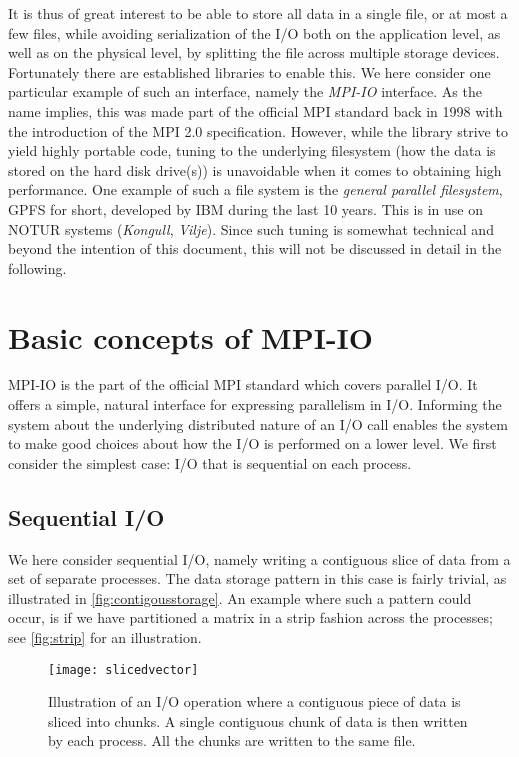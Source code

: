 It is thus of great interest to be able to store all data in a single file, or
at most a few files, while avoiding serialization of the I/O both on the
application level, as well as on the physical level, by splitting the file
across multiple storage devices. Fortunately there are established libraries to
enable this. We here consider one particular example of such an interface,
namely the \emph{MPI-IO} interface. As the name implies, this was made part of
the official MPI standard back in 1998 with the introduction of the MPI 2.0
specification. However, while the library strive to yield highly portable code,
tuning to the underlying filesystem (how the data is stored on the hard disk
drive(s)) is unavoidable when it comes to obtaining high performance. One
example of such a file system is the \emph{general parallel filesystem}, GPFS
for short, developed by IBM during the last 10 years. This is in use on NOTUR
systems (\emph{Kongull}, \emph{Vilje}). Since such tuning is somewhat technical
and beyond the intention of this document, this will not be discussed in detail
in the following.

\section{Basic concepts of MPI-IO}

MPI-IO is the part of the official MPI standard which covers parallel I/O. It
offers a simple, natural interface for expressing parallelism in I/O. Informing
the system about the underlying distributed nature of an I/O call enables the
system to make good choices about how the I/O is performed on a lower level. We
first consider the simplest case: I/O that is sequential on each process.

\subsection{Sequential I/O}

We here consider sequential I/O, namely writing a contiguous slice of data from
a set of separate processes. The data storage pattern in this case is fairly
trivial, as illustrated in \autoref{fig:contigousstorage}. An example where such
a pattern could occur, is if we have partitioned a matrix in a strip fashion
across the processes; see \autoref{fig:strip} for an illustration.

\begin{figure}[ht]
  \begin{center}
    \texttt{[image: slicedvector]}
  \end{center}
  \caption{
    Illustration of an I/O operation where a contiguous piece of data is sliced
    into chunks. A single contiguous chunk of data is then written by each
    process. All the chunks are written to the same file.
  }
  \label{fig:contigousstorage}
\end{figure}


